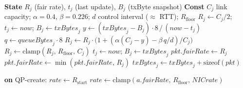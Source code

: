 \documentclass[conference]{IEEEtran}
\newcommand{\hpccfs}{\textsc{RDMA-RCP}\xspace}
\begin{document}
\begin{algorithm}[t]
\caption{\hpccfs switch --- per egress port $j$}
\label{alg:switch}
\begin{algorithmic}[1]
\State \textbf{State} $R_j$ (fair rate), $t_j$ (last update), $B_j$ (txByte snapshot)
\State \textbf{Const} $C_j$ link capacity; $\alpha{=}0.4$, $\beta{=}0.226$; $d$ control interval ($\approx$ RTT); $R_{\mathrm{floor}}$
     \State $R_j \gets C_j/2$;\; $t_j \gets now$;\; $B_j \gets \mathit{txBytes}_j$ 
  \EndIf
     \State $y \gets (\mathit{txBytes}_j - B_j)\cdot 8 \,/\, (now - t_j)$ 
     \State $q \gets \mathit{queueBytes}_j \cdot 8$ 
     \State $R_j \gets R_j \cdot \big(1 + (\alpha(C_j - y) - \beta\, q/d)/C_j\big)$ 
     \State $R_j \gets \mathrm{clamp}(R_j,\, R_{\mathrm{floor}},\, C_j)$
     \State $t_j \gets now$;\; $B_j \gets \mathit{txBytes}_j$
  \EndIf
   
     \State $pkt.\mathit{fairRate} \gets R_j$
  \Else
     \State $pkt.\mathit{fairRate} \gets \min(pkt.\mathit{fairRate},\, R_j)$ 
  \EndIf
  \State $\mathit{txBytes}_j \gets \mathit{txBytes}_j + \mathrm{sizeof}(pkt)$
\EndProcedure
\end{algorithmic}
\end{algorithm}

\begin{algorithm}[t]
\caption{\hpccfs sender (receiver echoes the header unchanged)}
\label{alg:sender}
\begin{algorithmic}[1]
\State \textbf{on} QP-create:\; $\mathit{rate} \gets R_{\mathrm{start}}$ 
\Statex
{}
   \Return {}\EndIf
  \State $\mathit{rate} \gets \mathrm{clamp}(a.\mathit{fairRate},\, R_{\mathrm{floor}},\, \mathit{NICrate})$ 
\EndProcedure
\end{algorithmic}
\end{algorithm}
\end{document}

